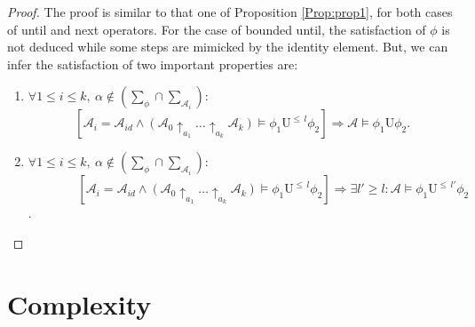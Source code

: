 \begin{proof}
The proof is similar to that one of Proposition \ref{Prop:prop1}, for both cases of until and next operators.  For the case of bounded until, the satisfaction of $\phi$ is not deduced while some steps are mimicked by the identity element. But, we can infer the satisfaction of two important properties are:
      \begin{enumerate}
        \item   $\forall 1\leq i\leq k,~\alpha\notin(\sum_{\phi}\cap\sum_{\mathcal{A}_i}):$\\$~~~~~~~~~~~~~~~~~[\mathcal{A}_{i}= \mathcal{A}_{id}\wedge (\mathcal{A}_{0}\uparrow_{a_{1}}\ldots\uparrow_{a_{k}}\mathcal{A}_{k})\models\phi_1\mathrm{U}^{\leq\,l}\phi_2]
            \Rightarrow\mathcal{A}\models\phi_1\mathrm{U}\phi_2$.
        \item   $\forall 1\leq i\leq k,~\alpha\notin(\sum_{\phi}\cap\sum_{\mathcal{A}_i}):$\\ $~~~~~~~~~~~~~~~~~~  [\mathcal{A}_{i}= \mathcal{A}_{id}\wedge (\mathcal{A}_{0}\uparrow_{a_{1}}\ldots\uparrow_{a_{k}}\mathcal{A}_{k})\models\phi_1\mathrm{U}^{\leq\,l}\phi_2]
            \Rightarrow\exists l'\geq l:\mathcal{A}\models\phi_1\mathrm{U}^{\leq\,l'}\phi_2$.
      \end{enumerate}
\end{proof}

\section{Complexity}\label{app:Comp}

